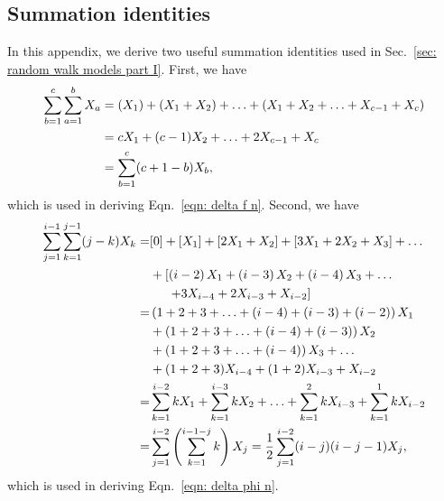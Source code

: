 \documentclass[../full_thesis/full_thesis.tex]{subfiles}
\begin{document}
\begin{subappendices}

\section{Summation identities}
\label{sec: summation identities}
In this appendix, we derive two useful summation identities used in
Sec.~\ref{sec: random walk models part I}. First, we have
\begin{align}
\sum_{b=1}^{c}\sum_{a=1}^{b} X_{a} & = \left( X_{1}\right) 
 + \left( X_{1} + X_{2} \right) + \ldots  +\left( X_{1} + X_{2} 
 + \ldots + X_{c-1} + X_{c}\right)\\
& = c X_{1} + (c-1)X_{2} + \ldots + 2 X_{c-1} + X_{c} \\
& = \sum_{b=1}^{c}(c+1-b)X_{b},
\label{eqn: SI 1}
\end{align}
which is used in deriving Eqn.~\eqref{eqn: delta f n}. Second, we have
\begin{align}
\sum_{j=1}^{i-1}\sum_{k=1}^{j-1}(j-k)X_{k} = & [0] + \left[ X_{1}\right] 
+ \left[2X_{1} + X_{2} \right] + \left[3X_{1} + 2X_{2} +X_{3}\right] 
+ \ldots  \nonumber \\
& + \left[\left(i-2\right)X_{1} + \left(i-3\right)X_{2} 
+ \left(i-4\right)X_{3} + \ldots \right. \nonumber \\
& \left. \hspace{5mm}+ 3X_{i-4} + 2X_{i-3} + X_{i-2}\right]  \\
= & \left(1 + 2 + 3 + \ldots +  (i-4) + (i-3) + (i-2)\right)X_{1} \nonumber  \\ 
& + \left(1 + 2 + 3 + \ldots +(i-4) + (i-3) \right)X_{2}  \nonumber \\ 
& + \left(1 + 2 + 3 + \ldots + (i-4) \right)X_{3} + \ldots  \nonumber \\ 
& + (1 + 2 + 3)X_{i-4} + (1+2)X_{i-3} + X_{i-2}  \\
= & \sum_{k=1}^{i-2}k X_{1} + \sum_{k=1}^{i-3}k X_{2}  + \ldots + \sum_{k=1}^{2}k X_{i-3} 
+ \sum_{k=1}^{1}kX_{i-2}  \\
= & \sum_{j=1}^{i-2}\left(\sum_{k=1}^{i-1-j}k\right)X_{j} = 
\frac{1}{2}\sum_{j=1}^{i-2}(i-j)(i-j-1)X_{j},
\label{eqn: SI 2}
\end{align}
which is used in deriving Eqn.~\eqref{eqn: delta phi n}.



\end{subappendices}
\end{document}
